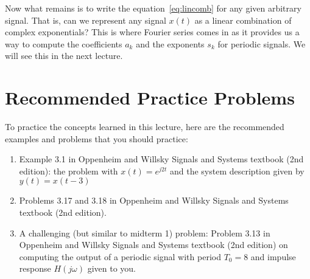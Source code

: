 \documentclass{ee102_notes}
\begin{document}
Now what remains is to write the equation~\eqref{eq:lincomb} for any given arbitrary signal. That is, can we represent any signal $x(t)$ as a linear combination of complex exponentials? This is where Fourier series comes in as it provides us a way to compute the coefficients \(a_k\) and the exponents \(s_k\) for periodic signals. We will see this in the next lecture.
\section{Recommended Practice Problems}

To practice the concepts learned in this lecture, here are the recommended examples and problems that you should practice:
\begin{enumerate}
  \item Example 3.1 in Oppenheim and Willsky Signals and Systems textbook (2nd edition): the problem with $x(t) = e^{j2t}$ and the system description given by $y(t) = x(t-3)$
  \item Problems 3.17 and 3.18 in Oppenheim and Willsky Signals and Systems textbook (2nd edition).
  \item A challenging (but similar to midterm 1) problem: Problem 3.13 in Oppenheim and Willsky Signals and Systems textbook (2nd edition) on computing the output of a periodic signal with period $T_0 = 8$ and impulse response $H(j\omega)$ given to you.
\end{enumerate}
\end{document}
